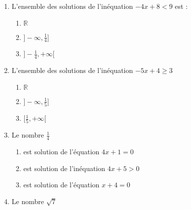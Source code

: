 \documentclass[oneside,twocolumn,landscape]{book}
\begin{document}
\begin{enumerate}


\item L'ensemble des solutions de l'inéquation $-4 x+8<9$ est :

\begin{enumerate}

\item\MauvaiseReponse $\mathbb{R}$


\item\MauvaiseReponse $]-\infty, \frac{1}{4}]$

\item\BonneReponse $]-\frac{1}{4},+\infty[$

\end{enumerate}






\item L'ensemble des solutions de l'inéquation $-5x+4 \geqslant 3$

\begin{enumerate}

\item\MauvaiseReponse $\mathbb{R}$

\item\BonneReponse $]-\infty,\frac{1}{5}]$

\item\MauvaiseReponse $[\frac{1}{5},+\infty[$


\end{enumerate}





\item Le nombre $\frac{1}{4}$

\begin{enumerate}

\item\MauvaiseReponse est solution de l'équation $4x+1=0$

\item\BonneReponse est solution de l'inéquation $4x+5>0$

\item\MauvaiseReponse est solution de l'équation $x+4=0$


\end{enumerate}



\item Le nombre $\sqrt{7}$

\begin{enumerate}


\end{enumerate}
\end{enumerate}
\end{document}
